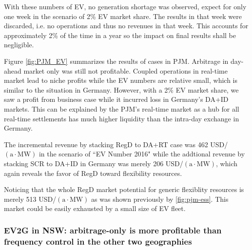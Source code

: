 With these numbers of EV, no generation shortage was observed, expect for only one week in the scenario of 2\% EV market share. The results in that week were discarded, i.e. no operations and thus no revenues in that week. This accounts for approximately 2\% of the time in a year so the impact on final results shall be negligible.

Figure \ref{fig:PJM_EV} summarizes the results of cases in PJM. Arbitrage in day-ahead market only was still not profitable. Coupled operations in real-time market lead to niche profits while the EV numbers are relative small, which is similar to the situation in Germany. However, with a 2\% EV market share, we saw a profit from business case while it incurred loss in Germany's DA+ID markets. This can be explained by the PJM's real-time market as a hub for all real-time settlements has much higher liquidity than the intra-day exchange in Germany.

The incremental revenue by stacking RegD to DA+RT case was 462 USD/$(\text{a} \cdot \text{MW})$ in the scenario of ``EV Number 2016" while the addtional revenue by stacking SCR to DA+ID in Germany was merely 206 USD/$(\text{a} \cdot \text{MW})$, which again reveals the favor of RegD toward flexibility resources. 

Noticing that the whole RegD market potential for generic flexiblity resources is merely 513 USD/$(\text{a} \cdot \text{MW})$ as was shown previously by \ref{fig:pjm-ess}. This market could be easily exhausted by a small size of EV fleet. 

\subsubsection{EV2G in NSW: arbitrage-only is more profitable than frequency control in the other two geographies}




